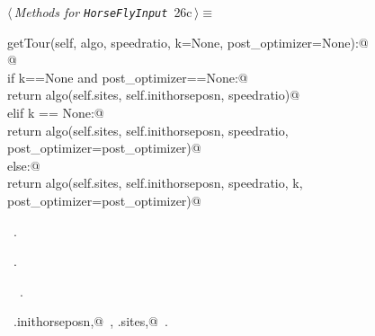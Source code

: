 \documentclass[11.5pt]{report}
\begin{document}
\begin{flushleft} \small\label{scrap32}\raggedright\small
{} $\langle\,${\itshape Methods for \verb|HorseFlyInput|}\nobreak\ {\footnotesize {26c}}$\,\rangle\equiv$
\vspace{-1ex}
\begin{list}{}{} \item
\mbox{}\verb@def getTour(self, algo, speedratio, k=None, post_optimizer=None):@\\
\mbox{}\verb@ @\\
\mbox{}\verb@    if k==None and post_optimizer==None:@\\
\mbox{}\verb@          return algo(self.sites, self.inithorseposn, speedratio)@\\
\mbox{}\verb@    elif k == None:@\\
\mbox{}\verb@          return algo(self.sites, self.inithorseposn, speedratio, post_optimizer=post_optimizer)@\\
\mbox{}\verb@    else:@\\
\mbox{}\verb@          return algo(self.sites, self.inithorseposn, speedratio, k, post_optimizer=post_optimizer)@\\
\mbox{}\verb@@{\NWsep}
\end{list}
\vspace{-1.5ex}
\footnotesize
\begin{list}{}{\setlength{\itemsep}{-\parsep}\setlength{\itemindent}{-\leftmargin}}
\item \NWtxtMacroDefBy\ .
\item \NWtxtMacroRefIn\ .
\item \NWtxtIdentsDefed\nobreak\  \verb@getTour@\nobreak\ .\item \NWtxtIdentsUsed\nobreak\  \verb@self.inithorseposn,@\nobreak\ , \verb@self.sites,@\nobreak\ .
\item{}
\end{list}
\vspace{4ex}
\end{flushleft}
\end{document}
